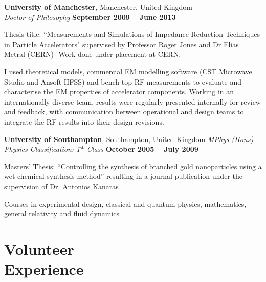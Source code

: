 \documentclass[margin,line]{resume}
\begin{document}
\begin{resume}
    \textbf{University of Manchester}, Manchester, United Kingdom \vspace{2mm}\\\vspace{1mm}%
    \textsl{Doctor of Philosophy} \hfill \textbf{ September 2009 -- June 2013}\vspace{-3mm}\\\vspace{-1mm}%
    \begin{list2}
        \item Thesis title: ``Measurements and Simulations of Impedance Reduction Techniques in Particle Accelerators" supervised by Professor Roger Jones and Dr Elias Metral (CERN)- Work done under placement at CERN.
        \item I used theoretical models, commercial EM modelling software (CST Microwave Studio and Ansoft HFSS) and bench top RF measurements to evaluate and characterise the EM properties of accelerator components. Working in an internationally diverse team, results were regularly presented internally for review and feedback, with communication between operational and design teams to integrate the RF results into their design revisions.
    \end{list2}\vspace{-1.5mm}
    \textbf{ University of Southampton}, Southampton, United Kingdom 
    \textsl{MPhys (Hons) Physics Classification: 1$^{\mathrm{st}}$ Class} \hfill \textbf{October 2005 -- July 2009}\vspace{-3mm}\\\vspace{-1mm}%
    \begin{list2}
        \item Masters' Thesis: ``Controlling the synthesis of branched gold nanoparticles using a wet chemical synthesis method'' resulting in a journal publication under the supervision of Dr. Antonios Kanaras
        \item Courses in experimental design, classical and quantum physics, mathematics, general relativity and fluid dynamics
    \end{list2}\vspace{-1.5mm}

    \section{\mysidestyle Volunteer\\Experience}



\end{resume}
\end{document}

